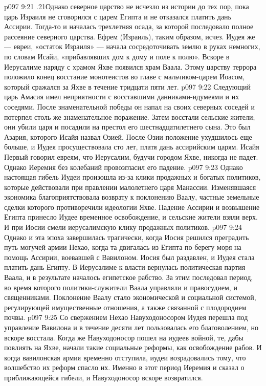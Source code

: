 \vs p097 9:21 .21Однако северное царство не исчезло из истории до тех пор, пока царь Израиля не сговорился с царем Египта и не отказался платить дань Ассирии. Тогда\hyp{}то и началась трехлетняя осада, за которой последовало полное рассеяние северного царства. Ефрем (Израиль), таким образом, исчез. Иудея же --- евреи, «остаток Израиля» --- начала сосредоточивать землю в руках немногих, по словам Исайи, «прибавлявших дом к дому и поле к полю». Вскоре в Иерусалиме наряду с храмом Яхве появился храм Ваала. Этому царству террора положило конец восстание монотеистов во главе с мальчиком\hyp{}царем Иоасом, который сражался за Яхве в течение тридцати пяти лет.
\vs p097 9:22 Следующий царь Амасия имел неприятности с восставшими данниками\hyp{}идумеями и их соседями. После знаменательной победы он напал на своих северных соседей и потерпел столь же знаменательное поражение. Затем восстали сельские жители; они убили царя и посадили на престол его шестнадцатилетнего сына. Это был Азария, которого Исайя назвал Озией. После Озии положение ухудшилось еще больше, и Иудея просуществовала сто лет, платя дань ассирийским царям. Исайя Первый говорил евреям, что Иерусалим, будучи городом Яхве, никогда не падет. Однако Иеремия без колебаний провозгласил его падение.
\vs p097 9:23 \pc Однако настоящая гибель Иудеи произошла из\hyp{}за клики продажных и богатых политиков, которые действовали при правлении малолетнего царя Манассии. Изменявшаяся экономика благоприятствовала возврату к поклонению Ваалу, частные земельные сделки которого противоречили идеологии Яхве. Падение Ассирии и возвышение Египта принесло Иудее временное освобождение, и сельские жители взяли верх. И при Иосии смели иерусалимскую клику продажных политиков.
\vs p097 9:24 Однако и эта эпоха завершилась трагически, когда Иосия решился преградить путь могучей армии Нехао, когда та двигалась из Египта по берегу моря на помощь Ассирии, воевавшей с Вавилоном. Иосия был раздавлен, и Иудея стала платить дань Египту. В Иерусалиме к власти вернулась политическая партия Ваала, и в результате началось  египетское рабство. За этим последовал период, во время которого политики\hyp{}служители Ваала управляли и правосудием, и священниками. Поклонение Ваалу стало экономической и социальной системой, регулирующей имущественные отношения, а также связанной с плодородием почвы.
\vs p097 9:25 Со свержением Нехао Навуходоносором Иудея перешла под управление Вавилона и в течение десяти лет пользовалась его благоволением, но вскоре восстала. Когда же Навуходоносор пошел на иудеев войной, те, дабы повлиять на Яхве, начали такие социальные реформы, как освобождение рабов. И когда вавилонская армия временно отступила, иудеи возрадовались тому, что волшебство их реформ спасло их. Именно в этот период Иеремия и сказал о приближающейся гибели, и Навуходоносор вскоре возвратился.
